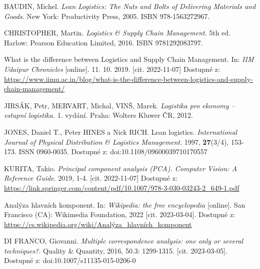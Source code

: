 



\begin{thebibliography}{1}

BAUDIN, Michel. \textit{Lean Logistics: The Nuts and Bolts of Delivering Materials and Goods}. New York: Productivity Press, 2005. ISBN 978-1563272967.

CHRISTOPHER, Martin. \textit{Logistics \& Supply Chain Management}. 5th ed. Harlow: Pearson Education Limited, 2016. ISBN 9781292083797.

What is the difference between Logistics and Supply Chain Management. In: \textit{IIM Udaipur Chronicles} [online]. 11. 10. 2019. [cit. 2022-11-07] Dostupné z: \url{https://www.iimu.ac.in/blog/what-is-the-difference-between-logistics-and-supply-chain-management/}

JIRSÁK, Petr, MERVART, Michal, VINŠ, Marek. \textit{Logistika pro ekonomy -- vstupní logistika.} 1. vydání. Praha: Wolters Kluwer ČR, 2012.

JONES, Daniel T., Peter HINES a Nick RICH. Lean logistics. \textit{International Journal of Physical Distribution \& Logistics Management}. 1997, \textbf{27}(3/4), 153-173. ISSN 0960-0035. Dostupné z: doi:10.1108/09600039710170557

KURITA, Takio. \textit{Principal component analysis (PCA). Computer Vision: A Reference Guide}. 2019, 1-4. [cit. 2022-11-07] Dostupné z: \url{https://link.springer.com/content/pdf/10.1007/978-3-030-03243-2\_649-1.pdf}

Analýza hlavních komponent. In: \textit{Wikipedia: the free encyclopedia} [online]. San Francisco (CA): Wikimedia Foundation, 2022 [cit. 2023-03-04]. Dostupné z: \url{https://cs.wikipedia.org/wiki/Analýza\_hlavních\_komponent}

DI FRANCO, Giovanni. \textit{Multiple correspondence analysis: one only or several techniques?}. Quality \& Quantity, 2016, 50.3: 1299-1315. [cit. 2023-03-05]. Dostupné z: doi:10.1007/s11135-015-0206-0


\end{thebibliography}
